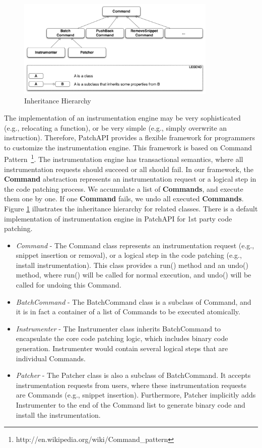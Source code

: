 \begin{figure}[ht!]
\centerline{\includegraphics[width=0.85\textwidth]{./figure/command/img.pdf}}
\caption{\label{fig:inh}Inheritance Hierarchy}
\end{figure}


The implementation of an instrumentation engine may be very sophisticated (e.g.,
relocating a function), or be very simple (e.g., simply overwrite an
instruction). Therefore, PatchAPI provides a flexible framework for programmers
to customize the instrumentation engine. This framework is based on Command
Pattern~\footnote{http://en.wikipedia.org/wiki/Command\_pattern}. The
instrumentation engine has transactional semantics, where all instrumentation
requests should succeed or all should fail. In our framework, the
\textbf{Command} abstraction represents an instrumentation request or a logical
step in the code patching process. We accumulate a list of \textbf{Commands},
and execute them one by one. If one \textbf{Command} fails, we undo all executed
\textbf{Commands}. Figure \ref{fig:inh} illustrates the inheritance hierarchy
for related classes. There is a default implementation of instrumentation engine
in PatchAPI for 1st party code patching.
\begin{itemize}
\item \emph{Command} - The Command class represents an instrumentation request (e.g.,
    snippet insertion or removal), or a logical step in the code patching (e.g.,
    install instrumentation). This class provides a run() method and an undo()
    method, where run() will be called for normal execution, and undo() will be
    called for undoing this Command.
\item \emph{BatchCommand} - The BatchCommand class is a subclass of Command, and it is
    in fact a container of a list of Commands to be executed atomically.
\item \emph{Instrumenter} - The Instrumenter class inherits BatchCommand to encapsulate
    the core code patching logic, which includes binary code generation.
    Instrumenter would contain several logical steps that are individual
    Commands.
\item \emph{Patcher} - The Patcher class is also a subclass of BatchCommand. It accepts
    instrumentation requests from users, where these instrumentation requests
    are Commands (e.g., snippet insertion). Furthermore, Patcher implicitly adds
    Instrumenter to the end of the Command list to generate binary code and
    install the instrumentation.
\end{itemize}
